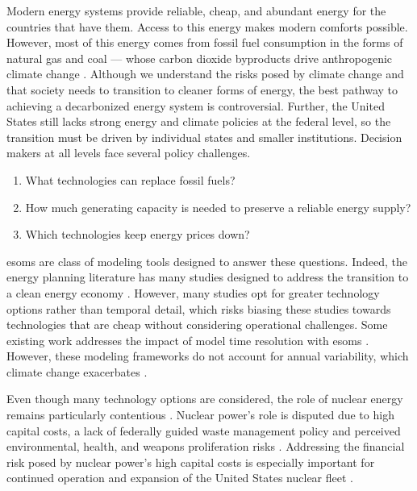 Modern energy systems provide reliable, cheap, and abundant energy for the
countries that have them. Access to this energy makes modern comforts possible. However,
most of this energy comes from fossil fuel consumption in the forms of natural gas
and coal --- whose carbon dioxide byproducts drive anthropogenic climate change
\cite{eia_frequently_2022}. Although we understand the risks posed by climate
change and that society needs to transition to cleaner forms of energy, the best
pathway to achieving a decarbonized energy system is controversial. Further, the
United States still lacks strong energy and climate policies at the federal level,
so the transition must be driven by individual states and smaller institutions.
Decision makers at all levels face several policy challenges.
\begin{enumerate}
  \item What technologies can replace fossil fuels?
  \item How much generating capacity is needed to preserve a reliable energy supply?
  \item Which technologies keep energy prices down?
\end{enumerate}

\glspl{esom} are class of modeling tools designed to answer these questions. Indeed,
the energy planning literature has many studies designed to address the transition
to a clean energy economy \cite{fattahi_systemic_2020,yue_review_2018,aryanpur_review_2021}.
However, many studies opt for greater technology options rather than temporal detail,
which risks biasing these studies towards technologies that are cheap without
considering operational challenges. Some existing work addresses the impact
of model time resolution with \glspl{esom} \cite{poncelet_impact_2016,
kotzur_impact_2018}. However, these modeling frameworks do not account for annual
variability, which climate change exacerbates \cite{van_der_wiel_contribution_2021}.

Even though many technology options are considered, the role of nuclear energy
remains particularly contentious \cite{lehtveer_how_2015,clemmer_nuclear_2018,
petti_future_2018}.
Nuclear power's role is disputed due to high capital costs, a lack of federally
guided waste management policy and perceived environmental, health, and weapons
proliferation risks \cite{clemmer_nuclear_2018,petti_future_2018}. Addressing
the financial risk posed by nuclear power's high capital costs is especially
important for continued operation and expansion of the United States nuclear fleet
\cite{petti_future_2018, lehtveer_how_2015}.

